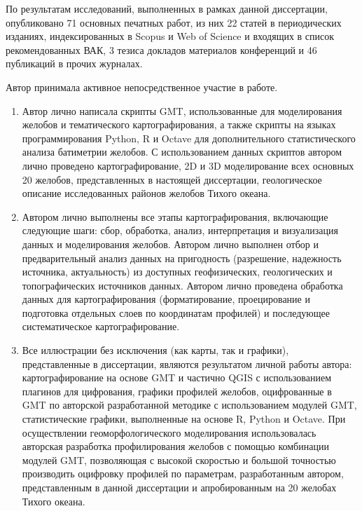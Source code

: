 
{\probation}
По результатам исследований, выполненных в рамках данной диссертации, опубликовано 71 основных печатных работ, из них 22 статей в периодических изданиях, индексированных в Scopus и Web of Science и входящих в список рекомендованных ВАК, 3 тезиса докладов материалов конференций и 46 публикаций в прочих журналах.

{\contribution} Автор принимала активное непосредственное участие в работе.
\begin{enumerate}[label=\emph{\Alph*})]
	\item Автор лично написала скрипты GMT, использованные для моделирования желобов и тематического картографирования, а также скрипты на языках программирования Python, R и Octave для дополнительного статистического анализа батиметрии желобов. С использованием данных скриптов автором лично проведено картографирование, 2D и 3D моделирование всех основных 20 желобов, представленных в настоящей диссертации, геологическое описание исследованных районов желобов Тихого океана. 

	\item Автором лично выполнены все этапы картографирования, включающие следующие шаги: сбор, обработка, анализ, интерпретация и визуализация данных и моделирования желобов. Автором лично выполнен отбор и предварительный анализ данных на пригодность (разрешение, надежность источника, актуальность) из доступных геофизических, геологических и топографических источников данных. Автором лично проведена обработка данных для картографирования (форматирование, проецирование и подготовка отдельных слоев по координатам профилей) и последующее систематическое картографирование. 

	\item Все иллюстрации без исключения (как карты, так и графики), представленные в диссертации, являются результатом личной работы автора: картографирование на основе GMT и частично QGIS с использованием плагинов для цифрования, графики профилей желобов, оцифрованные в GMT по авторской разработанной методике с использованием модулей GMT, статистические графики, выполненные на основе R, Python и Octave. При осуществлении геоморфологического моделирования использовалась авторская разработка профилирования желобов с помощью комбинации модулей GMT, позволяющая с высокой скоростью и большой точностью производить оцифровку профилей по параметрам, разработанным автором, представленным в данной диссертации и апробированным на 20 желобах Тихого океана.


\end{enumerate}
